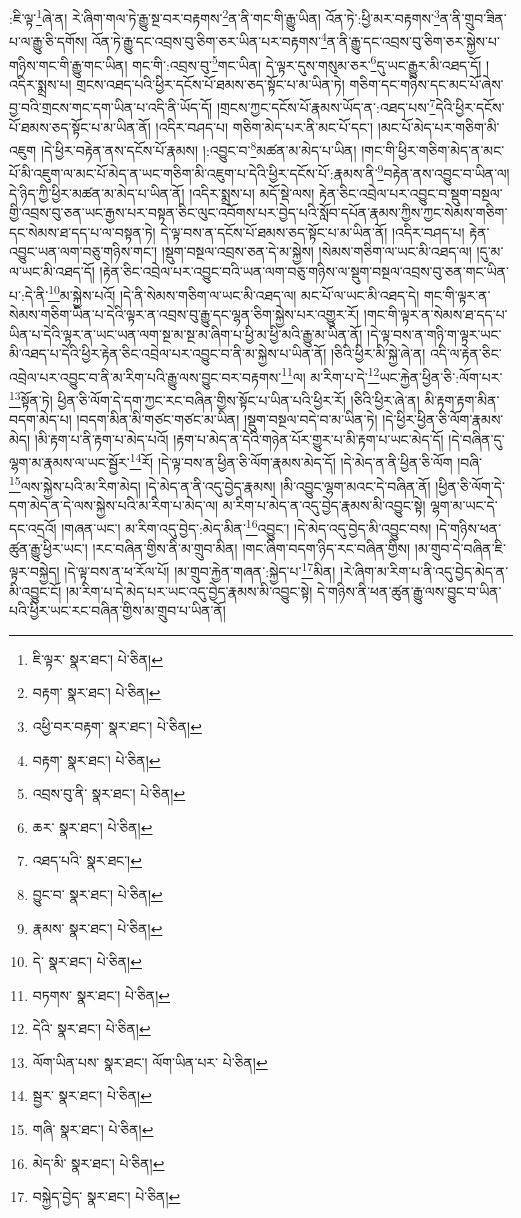 :ཇི་ལྟ་\footnote{ཇི་ལྟར་  སྣར་ཐང་།  པེ་ཅིན། }ཞེ་ན། རེ་ཞིག་གལ་ཏེ་རྒྱུ་སྔ་བར་བརྟགས་\footnote{བརྟག་  སྣར་ཐང་།  པེ་ཅིན། }ན་ནི་གང་གི་རྒྱུ་ཡིན། འོན་ཏེ་:ཕྱི་མར་བརྟགས་\footnote{འཕྱི་བར་བརྟག་  སྣར་ཐང་།  པེ་ཅིན། }ན་ནི་གྲུབ་ཟིན་པ་ལ་རྒྱུ་ཅི་དགོས། འོན་ཏེ་རྒྱུ་དང་འབྲས་བུ་ཅིག་ཅར་ཡིན་པར་བརྟགས་\footnote{བརྟག་  སྣར་ཐང་།  པེ་ཅིན། }ན་ནི་རྒྱུ་དང་འབྲས་བུ་ཅིག་ཅར་སྐྱེས་པ་གཉིས་གང་གི་རྒྱུ་གང་ཡིན། གང་གི་:འབྲས་བུ་\footnote{འབྲས་བུ་ནི་  སྣར་ཐང་།  པེ་ཅིན། }གང་ཡིན། དེ་ལྟར་དུས་གསུམ་ཅར་\footnote{ཆར་  སྣར་ཐང་།  པེ་ཅིན། }དུ་ཡང་རྒྱུར་མི་འཐད་དོ། །འདིར་སྨྲས་པ། གྲངས་འཐད་པའི་ཕྱིར་དངོས་པོ་ཐམས་ཅད་སྟོང་པ་མ་ཡིན་ཏེ། གཅིག་དང་གཉིས་དང་མང་པོ་ཞེས་བྱ་བའི་གྲངས་གང་དག་ཡིན་པ་འདི་ནི་ཡོད་དོ། །གྲངས་ཀྱང་དངོས་པོ་རྣམས་ཡོད་ན་:འཐད་པས་\footnote{འཐད་པའི་  སྣར་ཐང་། }དེའི་ཕྱིར་དངོས་པོ་ཐམས་ཅད་སྟོང་པ་མ་ཡིན་ནོ། །འདིར་བཤད་པ། གཅིག་མེད་པར་ནི་མང་པོ་དང་། །མང་པོ་མེད་པར་གཅིག་མི་འཇུག །དེ་ཕྱིར་བརྟེན་ནས་དངོས་པོ་རྣམས། །:འབྱུང་བ་\footnote{བྱུང་བ་  སྣར་ཐང་།  པེ་ཅིན། }མཚན་མ་མེད་པ་ཡིན། །གང་གི་ཕྱིར་གཅིག་མེད་ན་མང་པོ་མི་འཇུག་ལ་མང་པོ་མེད་ན་ཡང་གཅིག་མི་འཇུག་པ་དེའི་ཕྱིར་དངོས་པོ་:རྣམས་ནི་\footnote{རྣམས་  སྣར་ཐང་།  པེ་ཅིན། }བརྟེན་ནས་འབྱུང་བ་ཡིན་ལ། དེ་ཉིད་ཀྱི་ཕྱིར་མཚན་མ་མེད་པ་ཡིན་ནོ། །འདིར་སྨྲས་པ། མདོ་སྡེ་ལས། རྟེན་ཅིང་འབྲེལ་པར་འབྱུང་བ་སྡུག་བསྔལ་གྱི་འབྲས་བུ་ཅན་ཡང་རྒྱས་པར་བསྟན་ཅིང་ལུང་འབོགས་པར་བྱེད་པའི་སློབ་དཔོན་རྣམས་ཀྱིས་ཀྱང་སེམས་གཅིག་དང་སེམས་ཐ་དད་པ་ལ་བསྟན་ཏེ། དེ་ལྟ་བས་ན་དངོས་པོ་ཐམས་ཅད་སྟོང་པ་མ་ཡིན་ནོ། །འདིར་བཤད་པ། རྟེན་འབྱུང་ཡན་ལག་བཅུ་གཉིས་གང་། །སྡུག་བསྔལ་འབྲས་ཅན་དེ་མ་སྐྱེས། །སེམས་གཅིག་ལ་ཡང་མི་འཐད་ལ། །དུ་མ་ལ་ཡང་མི་འཐད་དོ། །རྟེན་ཅིང་འབྲེལ་པར་འབྱུང་བའི་ཡན་ལག་བཅུ་གཉིས་ལ་སྡུག་བསྔལ་འབྲས་བུ་ཅན་གང་ཡིན་པ་:དེ་ནི་\footnote{དེ་  སྣར་ཐང་།  པེ་ཅིན། }མ་སྐྱེས་པའོ། །དེ་ནི་སེམས་གཅིག་ལ་ཡང་མི་འཐད་ལ། མང་པོ་ལ་ཡང་མི་འཐད་དེ། གང་གི་ལྟར་ན་སེམས་གཅིག་ཡིན་པ་དེའི་ལྟར་ན་འབྲས་བུ་རྒྱུ་དང་ལྷན་ཅིག་སྐྱེས་པར་འགྱུར་རོ། །གང་གི་ལྟར་ན་སེམས་ཐ་དད་པ་ཡིན་པ་དེའི་ལྟར་ན་ཡང་ཡན་ལག་སྔ་མ་སྔ་མ་ཞིག་པ་ཕྱི་མ་ཕྱི་མའི་རྒྱུ་མ་ཡིན་ནོ། །དེ་ལྟ་བས་ན་གཉི་ག་ལྟར་ཡང་མི་འཐད་པ་དེའི་ཕྱིར་རྟེན་ཅིང་འབྲེལ་པར་འབྱུང་བ་ནི་མ་སྐྱེས་པ་ཡིན་ནོ། །ཅིའི་ཕྱིར་མི་སྐྱེ་ཞེ་ན། འདི་ལ་རྟེན་ཅིང་འབྲེལ་པར་འབྱུང་བ་ནི་མ་རིག་པའི་རྒྱུ་ལས་བྱུང་བར་བརྟགས་\footnote{བཏགས་  སྣར་ཐང་།  པེ་ཅིན། }ལ། མ་རིག་པ་དེ་\footnote{དེའི་  སྣར་ཐང་།  པེ་ཅིན། }ཡང་རྐྱེན་ཕྱིན་ཅི་:ལོག་པར་\footnote{ལོག་ཡིན་པས་  སྣར་ཐང་། ལོག་ཡིན་པར་  པེ་ཅིན། }སྟོན་ཏེ། ཕྱིན་ཅི་ལོག་དེ་དག་ཀྱང་རང་བཞིན་གྱིས་སྟོང་པ་ཡིན་པའི་ཕྱིར་རོ། །ཅིའི་ཕྱིར་ཞེ་ན། མི་རྟག་རྟག་མིན་བདག་མེད་པ། །བདག་མིན་མི་གཙང་གཙང་མ་ཡིན། །སྡུག་བསྔལ་བདེ་བ་མ་ཡིན་ཏེ། །དེ་ཕྱིར་ཕྱིན་ཅི་ལོག་རྣམས་མེད། །མི་རྟག་པ་ནི་རྟག་པ་མེད་པའོ། །རྟག་པ་མེད་ན་དེའི་གཉེན་པོར་གྱུར་པ་མི་རྟག་པ་ཡང་མེད་དོ། །དེ་བཞིན་དུ་ལྷག་མ་རྣམས་ལ་ཡང་སྦྱོར་\footnote{སྦྱར་  སྣར་ཐང་།  པེ་ཅིན། }རོ། །དེ་ལྟ་བས་ན་ཕྱིན་ཅི་ལོག་རྣམས་མེད་དོ། །དེ་མེད་ན་ནི་ཕྱིན་ཅི་ལོག །བཞི་\footnote{གཞི་  སྣར་ཐང་།  པེ་ཅིན། }ལས་སྐྱེས་པའི་མ་རིག་མེད། །དེ་མེད་ན་ནི་འདུ་བྱེད་རྣམས། །མི་འབྱུང་ལྷག་མའང་དེ་བཞིན་ནོ། །ཕྱིན་ཅི་ལོག་དེ་དག་མེད་ན་དེ་ལས་སྐྱེས་པའི་མ་རིག་པ་མེད་ལ། མ་རིག་པ་མེད་ན་འདུ་བྱེད་རྣམས་མི་འབྱུང་སྟེ། ལྷག་མ་ཡང་དེ་དང་འདྲའོ། །གཞན་ཡང་། མ་རིག་འདུ་བྱེད་:མེད་མིན་\footnote{མེད་མི་  སྣར་ཐང་།  པེ་ཅིན། }འབྱུང་། །དེ་མེད་འདུ་བྱེད་མི་འབྱུང་བས། །དེ་གཉིས་ཕན་ཚུན་རྒྱུ་ཕྱིར་ཡང་། །རང་བཞིན་གྱིས་ནི་མ་གྲུབ་མིན། །གང་ཞིག་བདག་ཉིད་རང་བཞིན་གྱིས། །མ་གྲུབ་དེ་བཞིན་ཇི་ལྟར་བསྐྱེད། །དེ་ལྟ་བས་ན་ཕ་རོལ་པོ། །མ་གྲུབ་རྐྱེན་གཞན་:སྐྱེད་པ་\footnote{བསྐྱེད་བྱེད་  སྣར་ཐང་།  པེ་ཅིན། }མིན། །རེ་ཞིག་མ་རིག་པ་ནི་འདུ་བྱེད་མེད་ན་མི་འབྱུང་ངོ། །མ་རིག་པ་དེ་མེད་པར་ཡང་འདུ་བྱེད་རྣམས་མི་འབྱུང་སྟེ། དེ་གཉིས་ནི་ཕན་ཚུན་རྒྱུ་ལས་བྱུང་བ་ཡིན་པའི་ཕྱིར་ཡང་རང་བཞིན་གྱིས་མ་གྲུབ་པ་ཡིན་ནོ། 